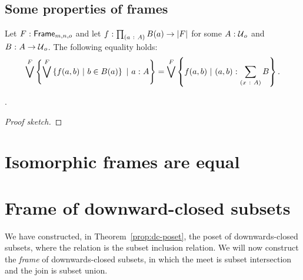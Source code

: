 \subsection{Some properties of frames}

\begin{lemma}\label{lem:flatten}
  Let $F\hspace{0.1mm}:\hspace{0.1mm}\mathsf{Frame}_{m, n, o}$ and let $f\hspace{0.1mm}:\hspace{0.1mm}\prod_{(a~:~A)} B(a) \rightarrow \left| F \right|$
  for some $A\hspace{0.1mm}:\hspace{0.1mm}\mathcal{U}{}_o$ and $B\hspace{0.1mm}:\hspace{0.1mm}A \rightarrow \mathcal{U}{}_o$. The following equality
  holds:
  \begin{equation*}
      \bigvee^F \left\{  \bigvee^F \left\{  f(a, b) ~|~ b \in B(a)  \right\} ~|~ a\hspace{0.1mm}:\hspace{0.1mm}A        \right\}
    = \bigvee^F \left\{  f(a, b)             ~|~ (a, b)\hspace{0.1mm}:\hspace{0.1mm}\sum_{(x~:~A)} B  \right\}.
  \end{equation*}
\end{lemma}

\begin{prop}\label{prop:distr}
  .
\end{prop}
\begin{proof}[Proof sketch]
\end{proof}

\section{Isomorphic frames are equal}\label{sec:frame-univ}


\section{Frame of downward-closed subsets}\label{sec:down-set-frame}

We have constructed, in Theorem~\ref{prop:dc-poset}, the poset of downwards-closed
subsets, where the relation is the subset inclusion relation. We will now construct the
\emph{frame} of downwards-closed subsets, in which the meet is subset intersection and the
join is subset union.

